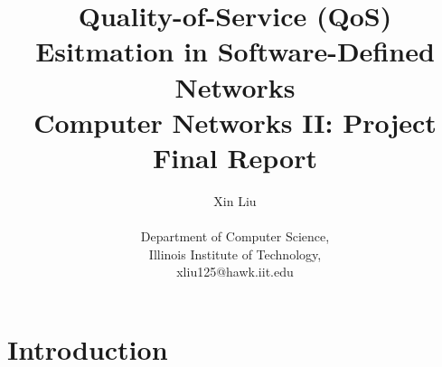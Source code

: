 \documentclass[12pt]{article}
\title{Quality-of-Service (QoS) Esitmation in Software-Defined Networks\\
	\large Computer Networks II: Project Final Report}
\author
{Xin Liu\\
\\
\normalsize{Department of Computer Science, }\\
\normalsize{Illinois Institute of Technology, }\\
\normalsize{xliu125@hawk.iit.edu}\\
}
\date{}
\begin{document}
 


\baselineskip24pt


\maketitle 





\section{Introduction}
\end{document}
